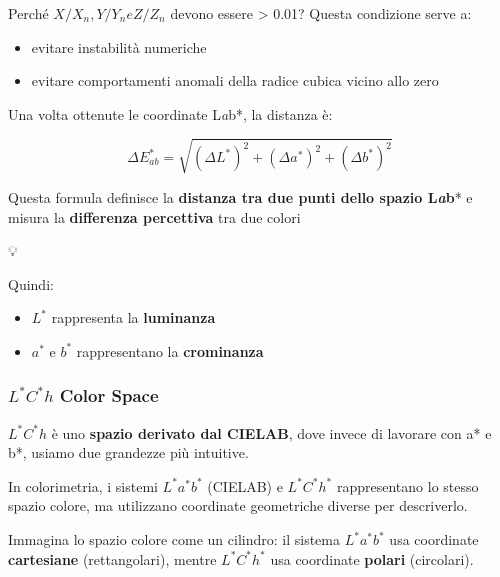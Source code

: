 \documentclass[
]{article}
\providecommand{\tightlist}{%
  \setlength{\itemsep}{0pt}\setlength{\parskip}{0pt}}
\begin{document}
Perché \(X/X_n, Y/Y_n e Z/Z_n\) devono essere \textgreater{} 0.01?
Questa condizione serve a:

\begin{itemize}
\tightlist
\item
  evitare instabilità numeriche
\item
  evitare comportamenti anomali della radice cubica vicino allo zero
\end{itemize}

Una volta ottenute le coordinate L\emph{a}b*, la distanza è:

\[
\Delta E_{ab}^* = \sqrt{ (\Delta L^*)^2 + (\Delta a^*)^2 + (\Delta b^*)^2 }
\]

Questa formula definisce la \textbf{distanza tra due punti dello spazio L\emph{a}b}* e misura la \textbf{differenza percettiva} tra due colori

💡

Quindi:

\begin{itemize}
\tightlist
\item
  \(L^*\) rappresenta la \textbf{luminanza}
\item
  \(a^*\) e \(b^*\) rappresentano la \textbf{crominanza}
\end{itemize}

\hypertarget{l-c-h-color-space}{%
\subsubsection{\texorpdfstring{\(L^* C^* h\) Color Space}{L\^{}* C\^{}* h Color Space}}\label{l-c-h-color-space}}

\(L^*C^*h\) è uno \textbf{spazio derivato dal CIELAB}, dove invece di lavorare con a* e b*, usiamo due grandezze più intuitive.

In colorimetria, i sistemi \(L^*a^*b^*\) (CIELAB) e \(L^* C^* h^*\) rappresentano lo stesso spazio colore, ma utilizzano coordinate geometriche diverse per descriverlo.

Immagina lo spazio colore come un cilindro: il sistema \(L^*a^*b^*\) usa coordinate \textbf{cartesiane} (rettangolari), mentre \(L^* C^* h^*\) usa coordinate \textbf{polari} (circolari).
\end{document}
